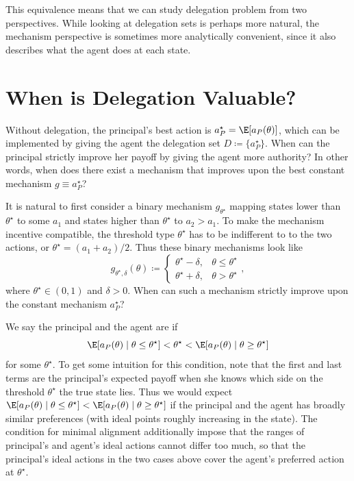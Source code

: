 This equivalence means that we can study delegation problem from two perspectives.
While looking at delegation sets is perhaps more natural, the mechanism perspective is sometimes more analytically convenient, since it also describes what the agent does at each state.


\section{When is Delegation Valuable?}
Without delegation, the principal's best action is \(a_P^\star = \E[a_P(\theta)]\), which can be implemented by giving the agent the delegation set \(D \coloneq \{a_P^\star\}\).
When can the principal strictly improve her payoff by giving the agent more authority?
In other words, when does there exist a mechanism that improves upon the best constant mechanism \(g \equiv a_P^\star\)?

It is natural to first consider a binary mechanism \(g_{\theta^\star}\) mapping states lower than \(\theta^\star\) to some \(a_1\) and states higher than \(\theta^\star\) to \(a_2 > a_1\).
To make the mechanism incentive compatible, the threshold type \(\theta^\star\) has to be indifferent to to the two actions, or \(\theta^\star = (a_1 + a_2) / 2\).
Thus these binary mechanisms look like
\[
  g_{\theta^\star, \delta}(\theta)
  \coloneq \begin{cases}
    \theta^\star - \delta, & \theta \leq \theta^\star \\
    \theta^\star + \delta, & \theta > \theta^\star
  \end{cases},
\]
where \(\theta^\star \in (0, 1)\) and \(\delta > 0\).
When can such a mechanism strictly improve upon the constant mechanism \(a_P^\star\)?

We say the principal and the agent are  if
\[
  \E[a_P(\theta) \mid \theta \leq \theta^\star]
  < \theta^\star
  < \E[a_P(\theta) \mid \theta \geq \theta^\star]
\]
for some \(\theta^\star\).
To get some intuition for this condition, note that the first and last terms are the principal's expected payoff when she knows which side on the threshold \(\theta^\star\) the true state lies.
Thus we would expect \(\E[a_P(\theta) \mid \theta \leq \theta^\star] < \E[a_P(\theta) \mid \theta \geq \theta^\star]\) if the principal and the agent has broadly similar preferences (with ideal points roughly increasing in the state).
The condition for minimal alignment additionally impose that the ranges of principal's and agent's ideal actions cannot differ too much, so that the principal's ideal actions in the two cases above cover the agent's preferred action at \(\theta^\star\).

